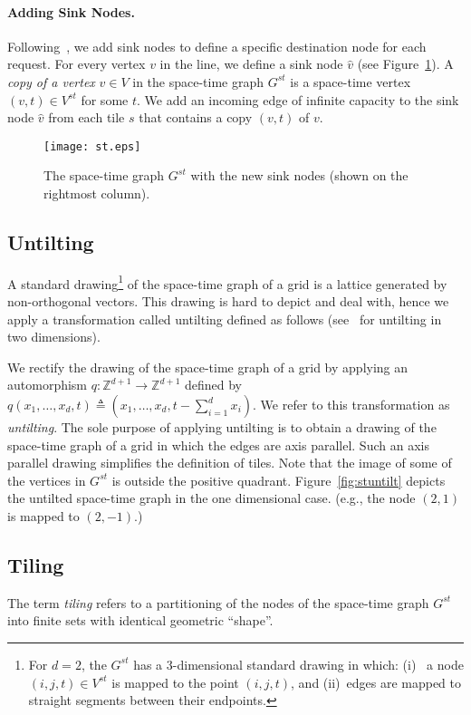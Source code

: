 \documentclass[11pt]{article}
\newenvironment{proof sketch}[1]{\noindent {\emph{Proof sketch of #1:}}}{\hfill \qed}
\begin{document}
\paragraph{Adding Sink Nodes.}
Following~\cite{AZ}, we add sink nodes to define a specific destination node for each request. For every vertex $v$ in the line, we define a sink node
$\hat v$ (see Figure~\ref{fig:stsink}).
A \emph{copy of a vertex} $v \in V$ in the space-time graph $G^{st}$ is a space-time vertex $(v,t)\in V^{st}$ for some $t$.
We add an incoming edge of infinite capacity to the sink node $\hat v$ from each tile $s$ that contains a copy $(v,t)$ of $v$.

\begin{figure}[h]\centering
\texttt{[image: st.eps]}
\caption{The space-time graph $G^{st}$ with the new sink nodes (shown on the rightmost column).
}
\label{fig:stsink}
\end{figure}

\subsection{Untilting}
A standard drawing\footnote{For $d=2$, the $G^{st}$ has a
    $3$-dimensional standard drawing in which: (i)~ a node $(i,j,t)\in
    V^{st}$ is mapped to the point $(i,j,t)$, and (ii)~edges are mapped
    to straight segments between their endpoints.}  of the space-time graph of a grid is a lattice generated by non-orthogonal vectors. This drawing is hard to depict and deal with, hence we apply a transformation called untilting defined as follows (see~\cite{RR} for untilting in two dimensions).


We rectify the drawing of the space-time graph of a grid by applying
an automorphism $q:\mathbb{Z}^{d+1} \rightarrow \mathbb{Z}^{d+1}$ defined by
$q(x_1,\ldots,x_d,t)\triangleq (x_1,\ldots,x_d,t-\sum_{i=1}^{d}x_i)$. We refer to this
transformation as \emph{untilting}. The sole purpose of applying
untilting is to obtain a drawing of the space-time graph of a grid in which the edges are axis parallel. Such an axis parallel drawing
simplifies the definition of tiles.
Note that the image of some of the vertices in $G^{st}$ is outside the positive quadrant.
Figure~\ref{fig:stuntilt} depicts the untilted space-time graph in the one dimensional case. (e.g., the node $(2,1)$ is mapped to $(2,-1)$.)


\subsection{Tiling}\label{sect:tiling}
The term \emph{tiling} refers to a partitioning of the nodes of the
space-time graph $G^{st}$ into finite sets with identical geometric
``shape''.
\end{document}
